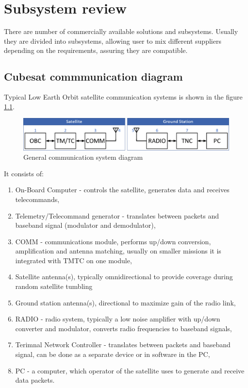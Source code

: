 \chapter{Subsystem review}
There are number of commercially available solutions and subsystems. Usually they are divided into subsystems, allowing user to mix different suppliers depending on the requirements, assuring they are compatible.

\section{Cubesat commmunication diagram}
Typical Low Earth Orbit satellite communication systems is shown in the figure \ref{comm_diagram}.

\begin{figure}[H]
    \centering
    \includegraphics[width=0.7\paperwidth]{img/2/comm_diagram.eps}
    \caption{General communication system diagram}
    \label{comm_diagram}
\end{figure}

It consists of:
\begin{enumerate}
    \item On-Board Computer - controls the satellite, generates data and receives telecommands,
    \item Telemetry/Telecommand generator - translates between packets and baseband signal (modulator and demodulator),
    \item COMM - communications module, performs up/down conversion, amplification and antenna matching, usually on smaller missions it is integrated with TMTC on one module,
    \item Satellite antenna(s), typically omnidirectional to provide coverage during random satellite tumbling
    \item Ground station antenna(s), directional to maximize gain of the radio link,
    \item RADIO - radio system, typically a low noise amplifier with up/down converter and modulator, converts radio frequencies to baseband signals,
    \item Terimnal Network Controller - translates between packets and baseband signal, can be done as a separate device or in software in the PC,
    \item PC - a computer, which operator of the satellite uses to generate and receive data packets.
\end{enumerate}

